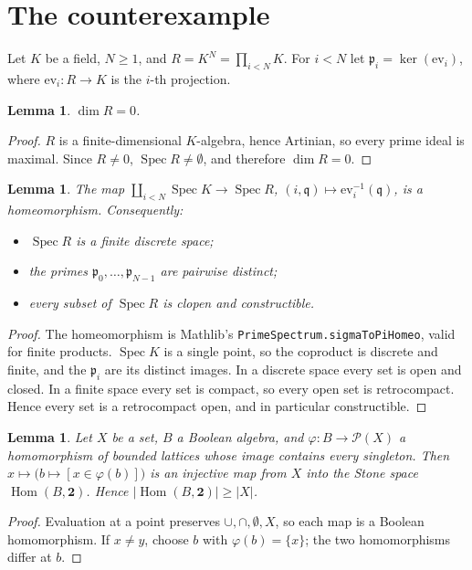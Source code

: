 \documentclass[11pt]{article}
\renewcommand{\_}{\oldus\allowbreak}
\newtheorem{lemma}[theorem]{Lemma}
\theoremstyle{definition}
\theoremstyle{remark}
\begin{document}
\section{The counterexample}

Let $K$ be a field, $N\ge1$, and $R=K^N=\prod_{i<N}K$. For $i<N$ let $\mathfrak p_i=\ker(\mathrm{ev}_i)$,
where $\mathrm{ev}_i:R\to K$ is the $i$-th projection.

\begin{lemma}
$\dim R=0$.
\end{lemma}
\begin{proof}
$R$ is a finite-dimensional $K$-algebra, hence Artinian, so every prime ideal is maximal. Since $R\ne0$,
$\operatorname{Spec}R\neq\emptyset$, and therefore $\dim R=0$.
\end{proof}

\begin{lemma}\label{lem:subsets}
The map $\coprod_{i<N}\operatorname{Spec}K\to\operatorname{Spec}R$, $(i,\mathfrak q)\mapsto
\mathrm{ev}_i^{-1}(\mathfrak q)$, is a homeomorphism. Consequently:
\begin{itemize}
\item $\operatorname{Spec}R$ is a finite discrete space;
\item the primes $\mathfrak p_0,\dots,\mathfrak p_{N-1}$ are pairwise distinct;
\item every subset of $\operatorname{Spec}R$ is clopen and constructible.
\end{itemize}
\end{lemma}
\begin{proof}
The homeomorphism is Mathlib's \texttt{PrimeSpectrum.sigmaToPiHomeo}, valid for finite products.
$\operatorname{Spec}K$ is a single point, so the coproduct is discrete and finite, and the
$\mathfrak p_i$ are its distinct images. In a discrete space every set is open and closed. In a finite
space every set is compact, so every open set is retrocompact. Hence every set is a retrocompact open, and
in particular constructible.
\end{proof}

\begin{lemma}\label{lem:stone}
Let $X$ be a set, $B$ a Boolean algebra, and $\varphi:B\to\mathcal P(X)$ a homomorphism of bounded
lattices whose image contains every singleton. Then $x\mapsto\bigl(b\mapsto[x\in\varphi(b)]\bigr)$ is an
injective map from $X$ into the Stone space $\operatorname{Hom}(B,\mathbf 2)$. Hence
$|\operatorname{Hom}(B,\mathbf 2)|\ge|X|$.
\end{lemma}
\begin{proof}
Evaluation at a point preserves $\cup,\cap,\emptyset,X$, so each map is a Boolean homomorphism. If
$x\ne y$, choose $b$ with $\varphi(b)=\{x\}$; the two homomorphisms differ at $b$.
\end{proof}
\end{document}
